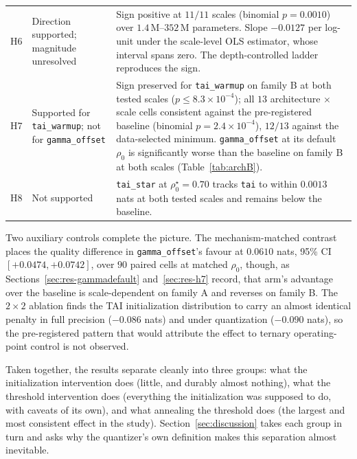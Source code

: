 \documentclass[final,5p,times,twocolumn]{elsarticle}
\theoremstyle{remark}
\newcommand{\rhoz}{\rho_{0}}
\begin{document}
\begin{table}[t]
\begin{tabular}{@{}p{0.9cm}p{2.7cm}p{6.1cm}@{}}
\addlinespace
H6 & Direction supported; magnitude unresolved &
Sign positive at $11/11$ scales (binomial $p = 0.0010$) over $1.4$\,M--$352$\,M
parameters. Slope $-0.0127$ per log-unit under the scale-level OLS estimator,
whose interval spans zero. The depth-controlled ladder reproduces the sign. \\
\addlinespace
H7 & Supported for \texttt{tai\_warmup}; not for \texttt{gamma\_offset} &
Sign preserved for \texttt{tai\_warmup} on family B at both tested scales
($p \leq 8.3\times 10^{-4}$); all $13$ architecture $\times$ scale cells
consistent against the pre-registered baseline (binomial
$p = 2.4\times 10^{-4}$), $12/13$ against the data-selected minimum. \texttt{gamma\_offset} at its default
$\rhoz$ is significantly worse than the baseline on family B at both scales
(Table~\ref{tab:archB}). \\
\addlinespace
H8 & Not supported &
\texttt{tai\_star} at $\rhoz^\star = 0.70$ tracks \texttt{tai} to within
$0.0013$ nats at both tested scales and remains below the baseline. \\
\bottomrule
\end{tabular}
\end{table}

Two auxiliary controls complete the picture. The mechanism-matched contrast
places the quality difference in \texttt{gamma\_offset}'s favour at
$0.0610$ nats, 95\% CI $[+0.0474, +0.0742]$, over $90$ paired cells at matched
$\rhoz$, though, as Sections~\ref{sec:res-gammadefault} and~\ref{sec:res-h7}
record, that arm's advantage over the baseline is scale-dependent on
family A and reverses on family B. The $2 \times 2$ ablation finds the TAI
initialization distribution to carry an almost identical penalty in full
precision ($-0.086$ nats) and under quantization ($-0.090$ nats), so the
pre-registered pattern that would attribute the effect to ternary
operating-point control is not observed.

Taken together, the results separate cleanly into three groups: what the
initialization intervention does (little, and durably almost nothing), what the
threshold intervention does (everything the initialization was supposed to do,
with caveats of its own), and what annealing the threshold does (the largest
and most consistent effect in the study). Section~\ref{sec:discussion} takes
each group in turn and asks why the quantizer's own definition makes this
separation almost inevitable.

\end{document}
